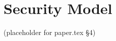 \documentclass[10pt,twocolumn]{article}
\begin{document}
\section{Security Model}\label{sec:security}(placeholder for paper.tex §4)

\end{document}
